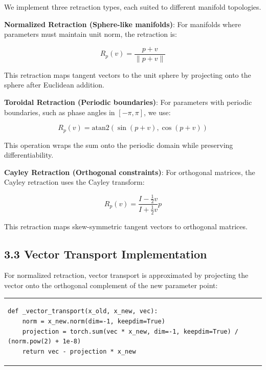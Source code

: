 \documentclass[12pt]{article}
\begin{document}
We implement three retraction types, each suited to different manifold topologies.

\textbf{Normalized Retraction (Sphere-like manifolds)}: For manifolds where parameters must maintain unit norm, the retraction is:

\begin{equation}
R_p(v) = \frac{p + v}{\|p + v\|}
\end{equation}

This retraction maps tangent vectors to the unit sphere by projecting onto the sphere after Euclidean addition.

\textbf{Toroidal Retraction (Periodic boundaries)}: For parameters with periodic boundaries, such as phase angles in $[-\pi, \pi]$, we use:

\begin{equation}
R_p(v) = \text{atan2}(\sin(p + v), \cos(p + v))
\end{equation}

This operation wraps the sum onto the periodic domain while preserving differentiability.

\textbf{Cayley Retraction (Orthogonal constraints)}: For orthogonal matrices, the Cayley retraction uses the Cayley transform:

\begin{equation}
R_p(v) = \frac{I - \frac{1}{2}v}{I + \frac{1}{2}v} p
\end{equation}

This retraction maps skew-symmetric tangent vectors to orthogonal matrices.

\subsection{3.3 Vector Transport Implementation}

For normalized retraction, vector transport is approximated by projecting the vector onto the orthogonal complement of the new parameter point:

\begin{center}
\begin{tabular}{p{}}
\begin{lstlisting}[style=pystyle]
def _vector_transport(x_old, x_new, vec):
    norm = x_new.norm(dim=-1, keepdim=True)
    projection = torch.sum(vec * x_new, dim=-1, keepdim=True) / (norm.pow(2) + 1e-8)
    return vec - projection * x_new
\end{lstlisting}
\end{tabular}
\end{center}
\end{document}
